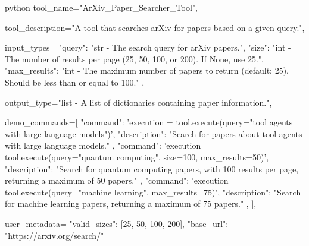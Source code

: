 \begin{codecolorbox}{python}
tool_name="ArXiv_Paper_Searcher_Tool",

tool_description="A tool that searches arXiv for papers based on a given query.",

input_types={
    "query": "str - The search query for arXiv papers.",
    "size": "int - The number of results per page (25, 50, 100, or 200). If None, use 25.",
    "max_results": "int - The maximum number of papers to return (default: 25). Should be less than or equal to 100."
},

output_type="list - A list of dictionaries containing paper information.",

demo_commands=[
    {
        "command": 'execution = tool.execute(query="tool agents with large language models")',
        "description": "Search for papers about tool agents with large language models."
    },
    {
        "command": 'execution = tool.execute(query="quantum computing", size=100, max_results=50)',
        "description": "Search for quantum computing papers, with 100 results per page, returning a maximum of 50 papers."
    },
    {
        "command": 'execution = tool.execute(query="machine learning", max_results=75)',
        "description": "Search for machine learning papers, returning a maximum of 75 papers."
    },
],

user_metadata={
    "valid_sizes": [25, 50, 100, 200],
    "base_url": "https://arxiv.org/search/"
}
\end{codecolorbox}



